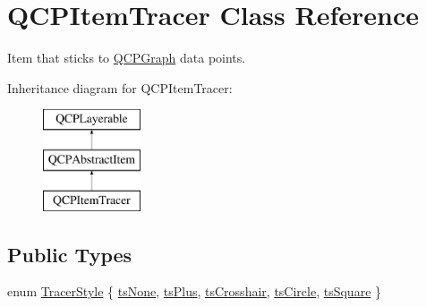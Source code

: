 \hypertarget{classQCPItemTracer}{\section{\-Q\-C\-P\-Item\-Tracer \-Class \-Reference}
\label{classQCPItemTracer}
}


\-Item that sticks to \hyperlink{classQCPGraph}{\-Q\-C\-P\-Graph} data points.  


\-Inheritance diagram for \-Q\-C\-P\-Item\-Tracer\-:\begin{figure}[H]
\begin{center}
\leavevmode
\includegraphics[height=3.000000cm]{classQCPItemTracer}
\end{center}
\end{figure}
\subsection*{\-Public \-Types}
\begin{DoxyCompactItemize}
\item 
enum \hyperlink{classQCPItemTracer_a2f05ddb13978036f902ca3ab47076500}{\-Tracer\-Style} \{ \*
\hyperlink{classQCPItemTracer_a2f05ddb13978036f902ca3ab47076500aac27462c79146225bfa8fba24d2ee8a4}{ts\-None}, 
\hyperlink{classQCPItemTracer_a2f05ddb13978036f902ca3ab47076500a3323fb04017146e4885e080a459472fa}{ts\-Plus}, 
\hyperlink{classQCPItemTracer_a2f05ddb13978036f902ca3ab47076500af562ec81ac3ba99e26ef8540cf1ec16f}{ts\-Crosshair}, 
\hyperlink{classQCPItemTracer_a2f05ddb13978036f902ca3ab47076500ae2252c28f4842880d71e9f94e69de94e}{ts\-Circle}, 
\*
\hyperlink{classQCPItemTracer_a2f05ddb13978036f902ca3ab47076500a4ed5f01f2c5fd86d980366d79f481b9b}{ts\-Square}
 \}
\end{DoxyCompactItemize}
